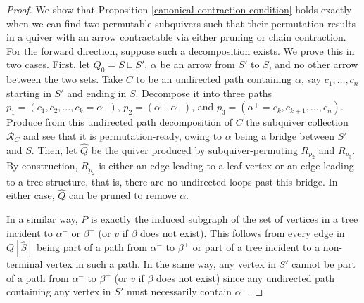 \documentclass[12pt]{amsart}
\theoremstyle{plain}
\theoremstyle{definition}
\begin{document}
\begin{proof}
    We show that Proposition \ref{canonical-contraction-condition} holds exactly when we can find two permutable subquivers such that their permutation results in a quiver with an arrow contractable via either pruning or chain contraction. For the forward direction, suppose such a decomposition exists. We prove this in two cases. First, let $Q_0 = S \sqcup S'$, $\alpha$ be an arrow from $S'$ to $S$, and no other arrow between the two sets. Take $C$ to be an undirected path containing $\alpha$, say $c_1, \ldots, c_n$ starting in $S'$ and ending in $S$. Decompose it into three paths $p_1 = (c_1, c_2,  \ldots, c_k = \alpha^-)$, $p_2 = (\alpha^-, \alpha^+)$, and $p_3 = (\alpha^+ = c_k, c_{k+1}, \ldots, c_n)$. Produce from this undirected path decomposition of $C$ the subquiver collection $\mathcal{R}_C$ and see that it is permutation-ready, owing to $\alpha$ being a bridge between $S'$ and $S$. Then, let $\hat{Q}$ be the quiver produced by subquiver-permuting $R_{p_2}$ and $R_{p_3}$. By construction, $R_{p_2}$ is either an edge leading to a leaf vertex or an edge leading to a tree structure, that is, there are no undirected loops past this bridge. In either case, $\hat Q$ can be pruned to remove $\alpha$.
    
    
    In a similar way, $P$ is exactly the induced subgraph of the set of vertices in a tree incident to $\alpha^-$ or $\beta^+$ (or $v$ if $\beta$ does not exist). This follows from every edge in $Q[\hat{S}]$ being part of a path from $\alpha^-$ to $\beta^+$ or part of a tree incident to a non-terminal vertex in such a path. In the same way, any vertex in $S'$ cannot be part of a path from $\alpha^-$ to $\beta^+$ (or $v$ if $\beta$ does not exist) since any undirected path containing any vertex in $S'$ must necessarily contain $\alpha^+$.


\end{proof}
\end{document}
